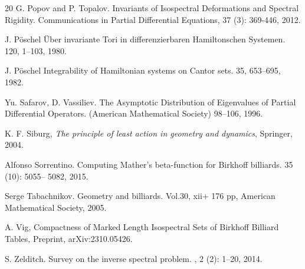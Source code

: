 \documentclass[12pt, openany]{amsart}
\theoremstyle{definition}
\theoremstyle{remark}
\theoremstyle{remark}
\theoremstyle{theorem}
\theoremstyle{theorem}
\theoremstyle{theorem}
\theoremstyle{theorem}
\begin{document}
\begin{thebibliography}{20}
G. Popov and P. Topalov. Invariants of Isospectral Deformations and Spectral Rigidity. Communications in Partial Differential Equations, 37 (3): 369-446, 2012.

J. P\"oschel
\newblock \"Uber invariante Tori in differenzierbaren Hamiltonschen Systemen.
 120, 1--103, 1980.

J. P\"oschel
\newblock Integrability of Hamiltonian systems on Cantor sets.
 35, 653--695, 1982.


Yu. Safarov, D. Vassiliev.
\newblock The Asymptotic Distribution of Eigenvalues of Partial Differential Operators.
\newblock (American Mathematical Society) 98–106, 1996.

K. F. Siburg, \textit{The principle of least action in geometry and dynamics}, Springer, 2004.

Alfonso Sorrentino.
\newblock Computing Mather's beta-function for Birkhoff billiards.
 35 (10): 5055-- 5082, 2015. 

Serge Tabachnikov.
\newblock Geometry and billiards.
 Vol.30, xii+ 176 pp, American Mathematical Society, 2005.

A. Vig, Compactness of Marked Length Isospectral Sets of Birkhoff Billiard Tables, Preprint, arXiv:2310.05426.


S. Zelditch.
\newblock Survey on the inverse spectral problem.
, 2 (2): 1--20, 2014.

\end{thebibliography}
\end{document}
